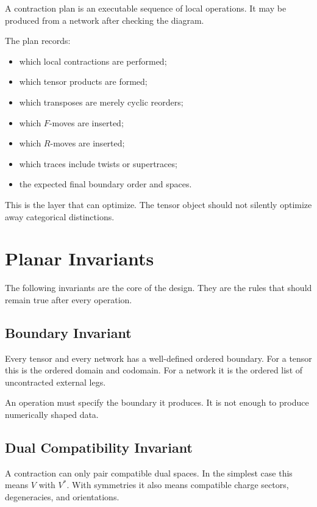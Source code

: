 \documentclass[11pt]{article}
\begin{document}
A contraction plan is an executable sequence of local operations.  It
may be produced from a network after checking the diagram.

The plan records:

\begin{itemize}
  \item which local contractions are performed;
  \item which tensor products are formed;
  \item which transposes are merely cyclic reorders;
  \item which \(F\)-moves are inserted;
  \item which \(R\)-moves are inserted;
  \item which traces include twists or supertraces;
  \item the expected final boundary order and spaces.
\end{itemize}

This is the layer that can optimize.  The tensor object should not
silently optimize away categorical distinctions.

\section{Planar Invariants}

The following invariants are the core of the design.  They are the
rules that should remain true after every operation.

\subsection{Boundary Invariant}

Every tensor and every network has a well-defined ordered boundary.
For a tensor this is the ordered domain and codomain.  For a network it
is the ordered list of uncontracted external legs.

An operation must specify the boundary it produces.  It is not enough
to produce numerically shaped data.

\subsection{Dual Compatibility Invariant}

A contraction can only pair compatible dual spaces.  In the simplest
case this means \(V\) with \(V^\ast\).  With symmetries it also means
compatible charge sectors, degeneracies, and orientations.
\end{document}
